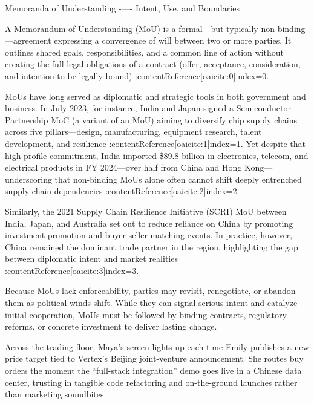 \begin{HistoricalSidebar}{Memoranda of Understanding -—- Intent, Use, and Boundaries}

  A Memorandum of Understanding (MoU) is a formal—but typically non-binding—agreement expressing a 
  convergence of will between two or more parties.  It outlines shared goals, responsibilities, and a 
  common line of action without creating the full legal obligations of a contract (offer, acceptance, 
  consideration, and intention to be legally bound) :contentReference[oaicite:0]{index=0}.

  \medskip
  
  MoUs have long served as diplomatic and strategic tools in both government and business.  In July 2023, 
  for instance, India and Japan signed a Semiconductor Partnership MoC (a variant of an MoU) aiming to 
  diversify chip supply chains across five pillars—design, manufacturing, equipment research, talent 
  development, and resilience :contentReference[oaicite:1]{index=1}.  Yet despite that high-profile 
  commitment, India imported \$89.8 billion in electronics, telecom, and electrical products in FY 
  2024—over half from China and Hong Kong—underscoring that non-binding MoUs alone often cannot shift 
  deeply entrenched supply-chain dependencies :contentReference[oaicite:2]{index=2}.

  \medskip
  
  Similarly, the 2021 Supply Chain Resilience Initiative (SCRI) MoU between India, Japan, and Australia 
  set out to reduce reliance on China by promoting investment promotion and buyer-seller matching events.  
  In practice, however, China remained the dominant trade partner in the region, highlighting the gap 
  between diplomatic intent and market realities :contentReference[oaicite:3]{index=3}.

  \medskip
  
  Because MoUs lack enforceability, parties may revisit, renegotiate, or abandon them as political winds 
  shift.  While they can signal serious intent and catalyze initial cooperation, MoUs must be followed 
  by binding contracts, regulatory reforms, or concrete investment to deliver lasting change.
  
\end{HistoricalSidebar}

\medskip

Across the trading floor, Maya’s screen lights up each time Emily publishes a new price target tied to Vertex’s 
Beijing joint-venture announcement. She routes buy orders the moment the “full-stack integration” demo goes 
live in a Chinese data center, trusting in tangible code refactoring and on-the-ground launches rather than 
marketing soundbites.

